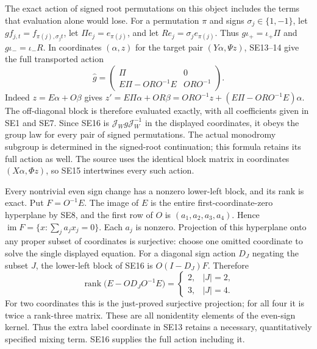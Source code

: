 The exact action of signed root permutations on this object includes
the terms that evaluation alone would lose. For a permutation $\pi$
and signs $\sigma_j\in\{1,-1\}$, let
$g f_{j,t}=f_{\pi(j),\sigma_jt}$, let $\Pi e_j=e_{\pi(j)}$,
and let $R e_j=\sigma_j e_{\pi(j)}$. Thus
$g\iota_+=\iota_+\Pi$ and $g\iota_-=\iota_-R$.
In coordinates $(\alpha,z)$ for the target pair $(Y\alpha,\Psi z)$,
SE13--14 give the full transported action
\[
 \widehat g=
 \begin{pmatrix}
  \Pi&0\\ E\Pi-ORO^{-1}E&ORO^{-1}
 \end{pmatrix}.
 \tag{SE16}
\]
Indeed $z=E\alpha+O\beta$ gives
$z'=E\Pi\alpha+OR\beta
=ORO^{-1}z+(E\Pi-ORO^{-1}E)\alpha$.
The off-diagonal block is therefore evaluated exactly, with all
coefficients given in SE1 and SE7. Since SE16 is
$\mathcal J_W g\mathcal J_W^{-1}$ in the displayed coordinates,
it obeys the group law for every pair of signed permutations.
The actual monodromy subgroup is determined in the signed-root
continuation; this formula retains its full action as well.
The source uses the identical block matrix in coordinates
$(X\alpha,\Phi z)$, so SE15 intertwines every such action.

Every nontrivial even sign change has a nonzero lower-left block,
and its rank is exact. Put $F=O^{-1}E$. The image of $E$ is the
entire first-coordinate-zero hyperplane by SE8, and the first row
of $O$ is $(a_1,a_2,a_3,a_4)$. Hence
$\operatorname{im}F=\{x:\sum_j a_jx_j=0\}$.
Each $a_j$ is nonzero. Projection of this hyperplane onto any
proper subset of coordinates is surjective: choose one omitted
coordinate to solve the single displayed equation. For a diagonal
sign action $D_J$ negating the subset $J$, the lower-left block
of SE16 is $O(I-D_J)F$. Therefore
\[
 \operatorname{rank}\bigl(E-OD_JO^{-1}E\bigr)
 =\begin{cases}2,&|J|=2,\\3,&|J|=4.\end{cases}
 \tag{SE18}
\]
For two coordinates this is the just-proved surjective projection;
for all four it is twice a rank-three matrix. These are all
nonidentity elements of the even-sign kernel. Thus the extra
label coordinate in SE13 retains a necessary, quantitatively
specified mixing term. SE16 supplies the full action including it.

